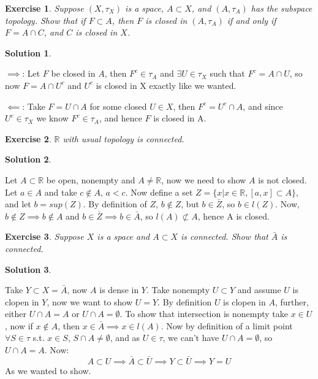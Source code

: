 \documentclass[11pt,a4paper]{article}
\newtheorem{Ex}{Exercise}
\newtheorem{Sol}{Solution}
\begin{document}
\begin{Ex}
	Suppose $(X, \tau_X)$ is a space, $A \subset X$, and $(A, \tau_A)$ has the subspace topology. Show that if $F \subset A$, then $F$ is closed in $(A, \tau_A)$ if and only if $F = A \cap C$, and $C$ is closed in $X$.  
\end{Ex}

\begin{Sol} \end{Sol}
\noindent $\implies$: Let $F$ be closed in $A$, then $F^c \in \tau_A$ and $\exists U \in \tau_X$ such that $F^c = A \cap U$, so now $F = A \cap U^c$ and $U^c$ is closed in X exactly like we wanted.

\noindent $\impliedby$: Take $F = U \cap A$ for some closed $U \in X$, then $F^c = U^c \cap A$, and since $U^c \in \tau_X$ we know $F^c \in \tau_A$, and hence $F$ is closed in A.

\begin{Ex}
  $\mathbb{R}$ with usual topology is connected.
\end{Ex}
 
\begin{Sol} \end{Sol}
Let $A \subset \mathbb{R}$ be open, nonempty and $A \neq \mathbb{R}$, now we need to show $A$ is not closed. Let $a \in A$ and take $c \not \in A$, $a < c$. Now define a set $Z = \{ x| x \in \mathbb{R}, [a,x] \subset A \}$, and let $b = sup(Z)$. By definition of $Z$, $b \not \in Z$, but $b \in \bar{Z}$, so $b \in l(Z) $. Now, $b \not\in Z \implies b \not\in A$ and $b \in \bar{Z} \implies b \in \bar{A}$, so $l(A) \not \subset A$, hence A is closed.  

\begin{Ex}
	Suppose $X$ is a space and $A \subset X$ is connected. Show that $\bar{A}$ is connected.
\end{Ex}

\begin{Sol} \end{Sol}
\noindent Take $Y \subset X = \bar{A}$, now $A$ is dense in $Y$. Take nonempty $U \subset Y$ and assume $U$ is clopen in $Y$, now we want to show $U = Y$. By definition $U$ is clopen in $A$, further, either $U \cap A = A$ or $U \cap A = \emptyset$. To show that intersection is nonempty take $x \in U$, now if $x \not\in A$, then $x \in \bar{A} \implies x \in l(A)$. Now by definition of a limit point $\forall S \in \tau$ s.t. $x \in S$, $S \cap A \neq \emptyset$, and as $U \in \tau$, we can't have $U \cap A = \emptyset$, so $U \cap A = A$. Now: $$A \subset U \implies \bar{A} \subset \bar{U} \implies Y \subset \bar{U} \implies Y = U$$ As we wanted to show.
\end{document}
